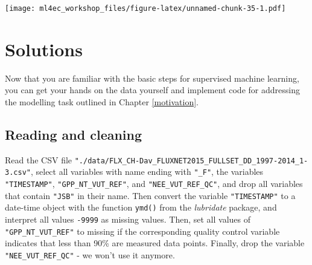 \documentclass[
]{book}
\begin{document}
\texttt{[image: ml4ec\_workshop\_files/figure-latex/unnamed-chunk-35-1.pdf]}

\hypertarget{solutions}{%
\chapter{Solutions}\label{solutions}}

Now that you are familiar with the basic steps for supervised machine learning, you can get your hands on the data yourself and implement code for addressing the modelling task outlined in Chapter \ref{motivation}.

\hypertarget{reading-and-cleaning-1}{%
\section{Reading and cleaning}\label{reading-and-cleaning-1}}

Read the CSV file \texttt{"./data/FLX\_CH-Dav\_FLUXNET2015\_FULLSET\_DD\_1997-2014\_1-3.csv"}, select all variables with name ending with \texttt{"\_F"}, the variables \texttt{"TIMESTAMP"}, \texttt{"GPP\_NT\_VUT\_REF"}, and \texttt{"NEE\_VUT\_REF\_QC"}, and drop all variables that contain \texttt{"JSB"} in their name. Then convert the variable \texttt{"TIMESTAMP"} to a date-time object with the function \texttt{ymd()} from the \emph{lubridate} package, and interpret all values \texttt{-9999} as missing values. Then, set all values of \texttt{"GPP\_NT\_VUT\_REF"} to missing if the corresponding quality control variable indicates that less than 90\% are measured data points. Finally, drop the variable \texttt{"NEE\_VUT\_REF\_QC"} - we won't use it anymore.
\end{document}
